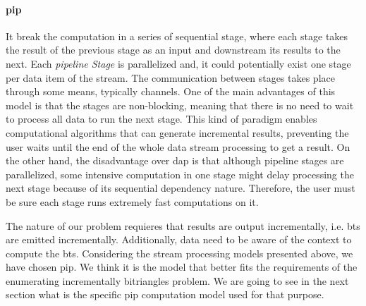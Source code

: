 \paragraph{\acrfull{pip}} It break the computation in a series of sequential stage, where each stage takes the result of the previous stage as an input and downstream its results to the next. 
Each \emph{pipeline Stage} is parallelized and, it could potentially exist one stage per data item of the stream. 
The communication between stages takes place through some means, typically channels. One of the main advantages of this model is that the stages are non-blocking, meaning that there is no need to wait to process all data to run the next stage. 
This kind of paradigm enables computational algorithms that can generate incremental results, preventing the user waits until the end of the whole data stream processing to get a result. 
On the other hand, the disadvantage over \acrshort{dap} is that although pipeline stages are parallelized, some intensive computation in one stage might delay processing the next stage because of its sequential dependency nature. Therefore, the user must be sure each stage runs extremely fast computations on it.

The nature of our problem requieres that results are  output incrementally, i.e.   \acrlong{bt}s are emitted incrementally. Additionally, data need to be aware of the context to compute the  \acrshort{bt}s. Considering the stream processing models presented above, we have chosen  \acrshort{pip}. We think it is the model that better fits the requirements of the enumerating incrementally bitriangles problem. 
We are going to see in the next section what is the specific \acrshort{pip} computation model used for that purpose.


